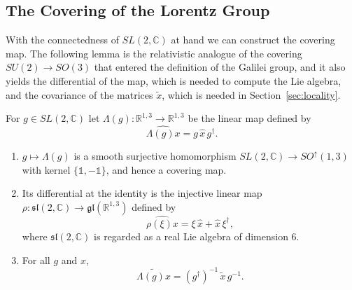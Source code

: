 	\subsection*{The Covering of the Lorentz Group}
	
	With the connectedness of $SL(2,\mathbb{C})$ at hand we can construct the covering map. The following lemma is the relativistic analogue of the covering $SU(2)\to SO(3)$ that entered the definition of the Galilei group, and it also yields the differential of the map, which is needed to compute the Lie algebra, and the covariance of the matrices $\tilde{x}$, which is needed in Section~\ref{sec:locality}.
	
	\begin{lemma}\label{lem:sl2c-covering}
		For $g\in SL(2,\mathbb{C})$ let $\Lambda(g):\mathbb{R}^{1,3}\to\mathbb{R}^{1,3}$ be the linear map defined by
		\begin{equation}\label{eq:lorentz-action}
			\widehat{\Lambda(g)x}=g\,\hat{x}\,g^\dagger.
		\end{equation}
		\begin{enumerate}
			\item $g\mapsto\Lambda(g)$ is a smooth surjective homomorphism $SL(2,\mathbb{C})\to SO^\uparrow(1,3)$ with kernel $\{\mathbb{1},-\mathbb{1}\}$, and hence a covering map.
			\item Its differential at the identity is the injective linear map $\rho:\mathfrak{sl}(2,\mathbb{C})\to\mathfrak{gl}(\mathbb{R}^{1,3})$ defined by
			\begin{equation}\label{eq:rho}
				\widehat{\rho(\xi)x}=\xi\,\hat{x}+\hat{x}\,\xi^\dagger,
			\end{equation}
			where $\mathfrak{sl}(2,\mathbb{C})$ is regarded as a real Lie algebra of dimension $6$.
			\item For all $g$ and $x$,
			\begin{equation}\label{eq:tilde-covariance}
				\widetilde{\Lambda(g)x}=(g^\dagger)^{-1}\,\tilde{x}\,g^{-1}.
			\end{equation}
		\end{enumerate}
	\end{lemma}
	
